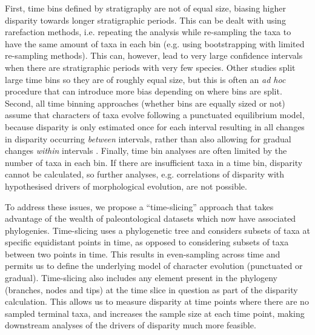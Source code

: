 \documentclass[12pt,a4paper]{article}
\begin{document}
First, time bins defined by stratigraphy are not of equal size, biasing higher disparity towards longer stratigraphic periods. 
This can be dealt with using rarefaction methods, i.e. repeating the analysis while re-sampling the taxa to have the same amount of taxa in each bin (e.g. using bootstrapping with limited re-sampling methods).
This can, however, lead to very large confidence intervals when there are stratigraphic periods with very few species.
Other studies split large time bins so they are of roughly equal size, but this is often an \textit{ad hoc} procedure that can introduce more bias depending on where bins are split.
Second, all time binning approaches (whether bins are equally sized or not) assume that characters of taxa evolve following a punctuated equilibrium model, because disparity is only estimated once for each interval resulting in all changes in disparity occurring \textit{between} intervals, rather than also allowing for gradual changes \textit{within} intervals \citep[shown as being quiet common in the fossil record;][]{Hunt21042015}.
Finally, time bin analyses are often limited by the number of taxa in each bin.
If there are insufficient taxa in a time bin, disparity cannot be calculated, so further analyses, e.g. correlations of disparity with hypothesised drivers of morphological evolution, are not possible.

To address these issues, we propose a ``time-slicing'' approach that takes advantage of the wealth of paleontological datasets which now have associated phylogenies. 
Time-slicing uses a phylogenetic tree and considers subsets of taxa at specific equidistant points in time, as opposed to considering subsets of taxa between two points in time.
This results in even-sampling across time and permits us to define the underlying model of character evolution (punctuated or gradual).  
Time-slicing also includes any element present in the phylogeny (branches, nodes and tips) at the time slice in question as part of the disparity calculation.
This allows us to measure disparity at time points where there are no sampled terminal taxa, and increases the sample size at each time point, making downstream analyses of the drivers of disparity much more feasible.
\end{document}
